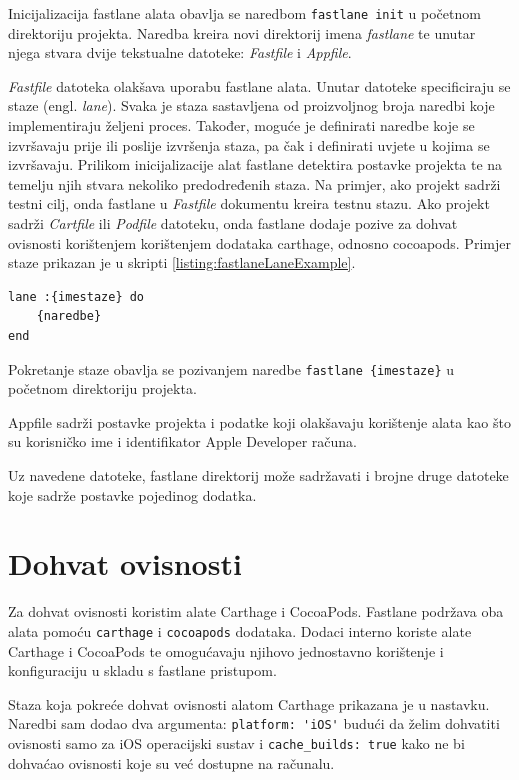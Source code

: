 \documentclass[times, utf8, diplomski, numeric]{fer}
\newcommand{\eng}[1]{(engl. \textit{#1})}
\begin{document}
\begin{appendices}
Inicijalizacija fastlane alata obavlja se naredbom \verb|fastlane init| u početnom direktoriju projekta. Naredba kreira novi direktorij imena \textit{fastlane} te unutar njega stvara dvije tekstualne datoteke: \textit{Fastfile} i \textit{Appfile}.

\textit{Fastfile} datoteka olakšava uporabu fastlane alata. Unutar datoteke specificiraju se staze \eng{lane}. Svaka je staza sastavljena od proizvoljnog broja naredbi koje implementiraju željeni proces. Također, moguće je definirati naredbe koje se izvršavaju prije ili poslije izvršenja staza, pa čak i definirati uvjete u kojima se izvršavaju. Prilikom inicijalizacije alat fastlane detektira postavke projekta te na temelju njih stvara nekoliko predodređenih staza. Na primjer, ako projekt sadrži testni cilj, onda fastlane u \textit{Fastfile} dokumentu kreira testnu stazu. Ako projekt sadrži \textit{Cartfile} ili \textit{Podfile} datoteku, onda fastlane dodaje pozive za dohvat ovisnosti korištenjem korištenjem dodataka carthage, odnosno cocoapods. Primjer staze prikazan je u skripti \ref{listing:fastlaneLaneExample}.

\begin{lstlisting}[caption=Primjer fastlane staze, label=listing:fastlaneLaneExample]
lane :{imestaze} do
    {naredbe}
end
\end{lstlisting}

Pokretanje staze obavlja se pozivanjem naredbe \verb|fastlane {imestaze}| u početnom direktoriju projekta.

Appfile sadrži postavke projekta i podatke koji olakšavaju korištenje alata kao što su korisničko ime i identifikator Apple Developer računa.

Uz navedene datoteke, fastlane direktorij može sadržavati i brojne druge datoteke koje sadrže postavke pojedinog dodatka.

\section{Dohvat ovisnosti}

Za dohvat ovisnosti koristim alate Carthage i CocoaPods. Fastlane podržava oba alata pomoću \verb|carthage| i \verb|cocoapods| dodataka. Dodaci interno koriste alate Carthage i CocoaPods te omogućavaju njihovo jednostavno korištenje i konfiguraciju u skladu s fastlane pristupom.

Staza koja pokreće dohvat ovisnosti alatom Carthage prikazana je u nastavku. Naredbi sam dodao dva argumenta: \verb|platform: 'iOS'| budući da želim dohvatiti ovisnosti samo za iOS operacijski sustav i \verb|cache_builds: true| kako ne bi dohvaćao ovisnosti koje su već dostupne na računalu.


\end{appendices}
\end{document}
